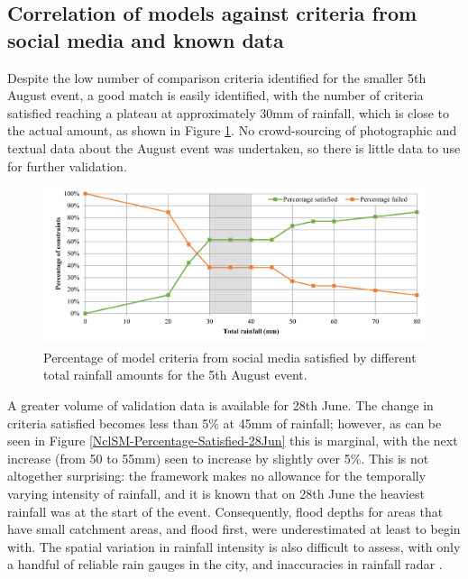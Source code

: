 \subsection{Correlation of models against criteria from social media and known data}

Despite the low number of comparison criteria identified for the smaller 5th August event, a good match is easily identified, with the number of criteria satisfied reaching a plateau at approximately 30mm of rainfall, which is close to the actual amount, as shown in Figure \ref{NclSM-Percentage-Satisfied-5Aug}. No crowd-sourcing of photographic and textual data about the August event was undertaken, so there is little data to use for further validation.

\begin{figure}[tpb]
	\centering
	\includegraphics[width=1.0\textwidth]{nowcasting-figures/nclsm-percentage-satisfied-5aug.png}
	\caption{Percentage of model criteria from social media satisfied by different total rainfall amounts for the 5th August event.}
	\label{NclSM-Percentage-Satisfied-5Aug}
\end{figure}

A greater volume of validation data is available for 28th June. The change in criteria satisfied becomes less than 5\% at 45mm of rainfall; however, as can be seen in Figure \ref{NclSM-Percentage-Satisfied-28Jun} this is marginal, with the next increase (from 50 to 55mm) seen to increase by slightly over 5\%. This is not altogether surprising: the framework makes no allowance for the temporally varying intensity of rainfall, and it is known that on 28th June the heaviest rainfall was at the start of the event. Consequently, flood depths for areas that have small catchment areas, and flood first, were underestimated at least to begin with. The spatial variation in rainfall intensity is also difficult to assess, with only a handful of reliable rain gauges in the city, and inaccuracies in rainfall radar \citep{Wood2000}.

